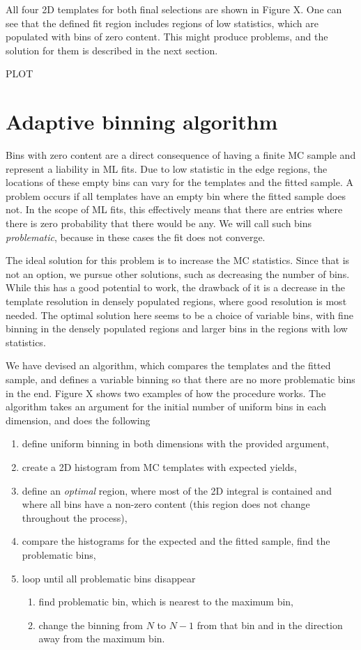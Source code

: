\documentclass[  headings=standardclasses,
  headings=big,oneside,a4paper,openany,12pt]{scrbook}
\begin{document}
All four 2D templates for both final selections are shown in Figure X. One can see that the defined fit region includes regions of low statistics, which are populated with bins of zero content. This might produce problems, and the solution for them is described in the next section.


PLOT

\section{Adaptive binning algorithm}

Bins with zero content are a direct consequence of having a finite MC sample and represent a liability in ML fits. Due to low statistic in the edge regions, the locations of these empty bins can vary for the templates and the fitted sample. A problem occurs if all templates have an empty bin where the fitted sample does not. In the scope of ML fits, this effectively means that there are entries where there is zero probability that there would be any. We will call such bins \textit{problematic}, because in these cases the fit does not converge.

The ideal solution for this problem is to increase the MC statistics. Since that is not an option, we pursue other solutions, such as decreasing the number of bins. While this has a good potential to work, the drawback of it is a decrease in the template resolution in densely populated regions, where good resolution is most needed. The optimal solution here seems to be a choice of variable bins, with fine binning in the densely populated regions and larger bins in the regions with low statistics.

We have devised an algorithm, which compares the templates and the fitted sample, and defines a variable binning so that there are no more problematic bins in the end. Figure X shows two examples of how the procedure works. The algorithm takes an argument for the initial number of uniform bins in each dimension, and does the following
\begin{enumerate}
\item define uniform binning in both dimensions with the provided argument,
\item create a 2D histogram from MC templates with expected yields,
\item define an \textit{optimal} region, where most of the 2D integral is contained and where all bins have a non-zero content (this region does not change throughout the process),
\item compare the histograms for the expected and the fitted sample, find the problematic bins,
\item loop until all problematic bins disappear
	\begin{enumerate}
	\item find problematic bin, which is nearest to the maximum bin,
	\item change the binning from $N$ to $N-1$ from that bin and in the direction away from the maximum bin.
	\end{enumerate}
\end{enumerate}
\end{document}
